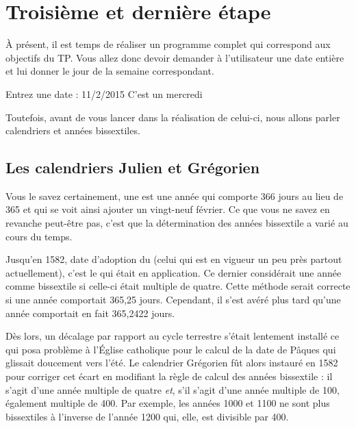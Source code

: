 \section{Troisième et dernière étape}
\label{troisieme-et-derniere-etape }

À présent, il est temps de réaliser un programme complet qui correspond aux objectifs du TP. Vous
allez donc devoir demander à l'utilisateur une date entière et lui
donner le jour de la semaine correspondant.

\begin{C}
Entrez une date : 11/2/2015
C'est un mercredi
\end{C}

Toutefois, avant de vous lancer dans la réalisation de celui-ci, nous
allons parler calendriers et années bissextiles.

\subsection{Les calendriers Julien et Grégorien}
\label{les-calendriers-julien-et-gregorien}

Vous le savez certainement, une
 est une année qui comporte 366 jours au lieu de 365 et qui
se voit ainsi ajouter un vingt-neuf février. Ce que vous ne savez en
revanche peut-être pas, c'est que la détermination des années bissextile
a varié au cours du temps.

Jusqu'en 1582, date d'adoption du
 (celui qui est en vigueur un peu près partout actuellement),
c'est le
qui était en application. Ce dernier considérait une année comme
bissextile si celle-ci était multiple de quatre. Cette méthode serait
correcte si une année comportait 365,25 jours. Cependant, il s'est avéré
plus tard qu'une année comportait en fait 365,2422 jours.

Dès lors, un décalage par rapport au cycle terrestre s'était lentement
installé ce qui posa problème à l'Église catholique pour le calcul de la
date de Pâques qui glissait doucement vers l'été. Le calendrier
Grégorien fût alors instauré en 1582 pour corriger cet écart en
modifiant la règle de calcul des années bissextile : il s'agit d'une
année multiple de quatre \emph{et}, s'il s'agit d'une année multiple de
100, également multiple de 400. Par exemple, les années 1000 et 1100 ne
sont plus bissextiles à l'inverse de l'année 1200 qui, elle, est
divisible par 400.

